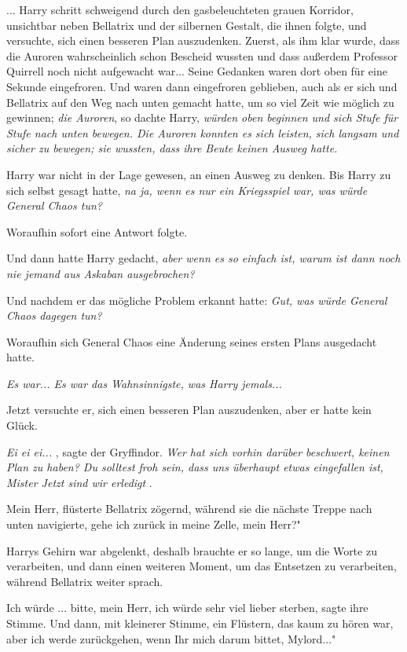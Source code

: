 ... Harry schritt schweigend durch den gasbeleuchteten grauen Korridor,
unsichtbar neben Bellatrix und der silbernen Gestalt, die ihnen folgte, und
versuchte, sich einen besseren Plan auszudenken. Zuerst, als ihm klar wurde,
dass die Auroren wahrscheinlich schon Bescheid wussten und dass außerdem
Professor Quirrell noch nicht aufgewacht war... Seine Gedanken waren dort oben
für eine Sekunde eingefroren. Und waren dann eingefroren geblieben, auch als er
sich und Bellatrix auf den Weg nach unten gemacht hatte, um so viel Zeit wie
möglich zu gewinnen; \emph{die Auroren}, so dachte Harry, \emph{würden oben
beginnen und sich Stufe für Stufe nach unten bewegen. Die Auroren konnten es
sich leisten, sich langsam und sicher zu bewegen; sie wussten, dass ihre Beute
keinen Ausweg hatte.}

Harry war nicht in der Lage gewesen, an einen Ausweg zu denken. Bis Harry zu
sich selbst gesagt hatte, \emph{na ja, wenn es nur ein Kriegsspiel war, was
würde General Chaos tun?}

Woraufhin sofort eine Antwort folgte.

Und dann hatte Harry gedacht,\emph{ aber wenn es so einfach ist, warum ist dann
noch nie jemand aus Askaban ausgebrochen?}

Und nachdem er das mögliche Problem erkannt hatte: \emph{Gut, was würde General
Chaos dagegen tun? }

Woraufhin sich General Chaos eine Änderung seines ersten Plans ausgedacht hatte.

\emph{Es war... Es war das Wahnsinnigste, was Harry jemals...}

Jetzt versuchte er, sich einen besseren Plan auszudenken, aber er hatte kein
Glück.

\emph{ \glqq Ei ei ei...\grqq{} }, sagte der Gryffindor. \emph{Wer hat sich
vorhin darüber beschwert, keinen Plan zu haben? Du solltest froh sein, dass uns
überhaupt etwas eingefallen ist, Mister \glqq Jetzt sind wir erledigt\grqq{} }.

\glqq Mein Herr\grqq{}, flüsterte Bellatrix zögernd, während sie die nächste
Treppe nach unten navigierte, \glqq gehe ich zurück in meine Zelle, mein Herr?"

Harrys Gehirn war abgelenkt, deshalb brauchte er so lange, um die Worte zu
verarbeiten, und dann einen weiteren Moment, um das Entsetzen zu verarbeiten,
während Bellatrix weiter sprach.

\glqq Ich würde ... bitte, mein Herr, ich würde sehr viel lieber sterben\grqq{},
sagte ihre Stimme. Und dann, mit kleinerer Stimme, ein Flüstern, das kaum zu
hören war, \glqq aber ich werde zurückgehen, wenn Ihr mich darum bittet,
Mylord..."

